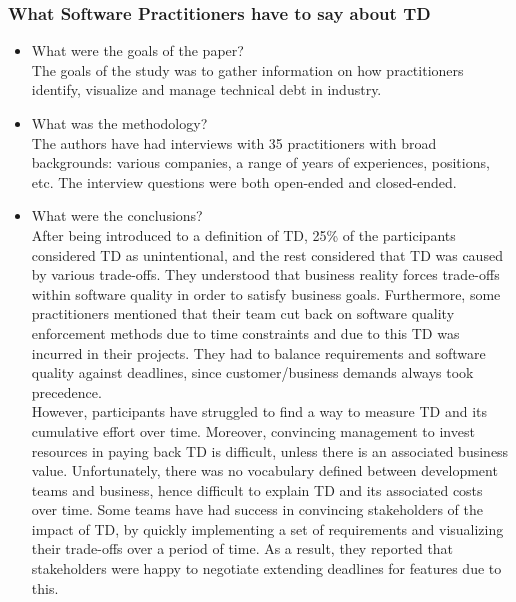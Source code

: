 \documentclass{mprop}
\begin{document}
\subsubsection{What Software Practitioners have to say about TD} \cite{Lim2012}
\begin{itemize}
	\item What were the goals of the paper? \\
	      The goals of the study was to gather information on how
	      practitioners identify, visualize and manage technical debt in
	      industry.
	\item What was the methodology? \\
	      The authors have had interviews with 35 practitioners with broad
	      backgrounds: various companies, a range of years of experiences,
	      positions, etc. The interview questions were both open-ended and
	      closed-ended.
	\item What were the conclusions? \\
	      After being introduced to a definition of TD, 25\% of the
	      participants considered TD as unintentional, and the rest considered
	      that TD was caused by various trade-offs. They understood that
	      business reality forces trade-offs within software quality in order
	      to satisfy business goals. Furthermore, some practitioners mentioned
	      that their team cut back on software quality enforcement methods due
	      to time constraints and due to this TD was incurred in their
	      projects. They had to balance requirements and software quality
	      against deadlines, since customer/business demands always took
	      precedence. \\

	      However, participants have struggled to find a way to measure TD and
	      its cumulative effort over time. Moreover, convincing management to
	      invest resources in paying back TD is difficult, unless there is an
	      associated business value. Unfortunately, there was no vocabulary
	      defined between development teams and business, hence difficult to
	      explain TD and its associated costs over time. Some teams have had
	      success in convincing stakeholders of the impact of TD, by quickly
	      implementing a set of requirements and visualizing their trade-offs
	      over a period of time. As a result, they reported that stakeholders
	      were happy to negotiate extending deadlines for features due to
	      this. \\


\end{itemize}
\end{document}
